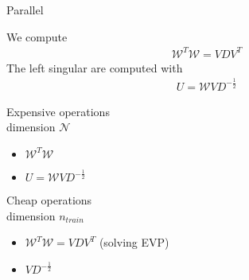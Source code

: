 \begin{frame}{Parallel}
	\Large{}
	\normalsize
	
	We compute
	\begin{align*}
	\mathcal{W}^T \mathcal{W} = V D V^T
	\end{align*}
	The left singular are computed with 
	\begin{align*}
	U = \mathcal{W}VD^{-\frac{1}{2}}
	\end{align*}
	\begin{minipage}{\textwidth}
		\centering
		\begin{minipage}[t]{0.49\textwidth}
			Expensive operations\\
			dimension $\mathcal{ N }$
			\begin{itemize}
				\item $\mathcal{W}^T \mathcal{W}$
				\item $	U = \mathcal{W}VD^{-\frac{1}{2}}$
			\end{itemize}
		\end{minipage}
		\begin{minipage}[t]{0.49\textwidth}
			Cheap operations\\
			dimension $n_{train}$
			\begin{itemize}
				\item $\mathcal{W}^T \mathcal{W} = V D V^T$ (solving EVP)
				\item $VD^{-\frac{1}{2}}$
			\end{itemize}
		\end{minipage}

	\end{minipage}	
\end{frame}